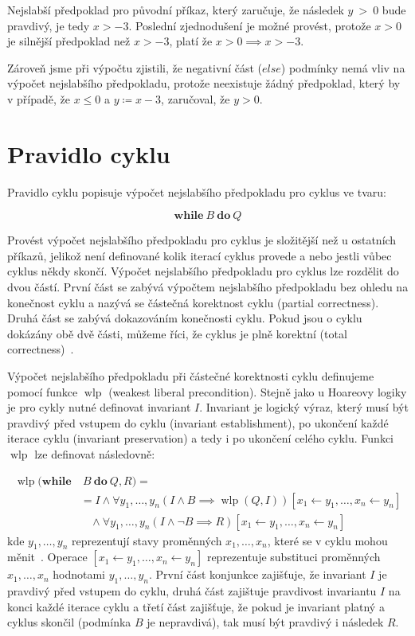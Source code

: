 Nejslabší předpoklad pro původní příkaz,
který zaručuje, že následek $y~>~0$ bude pravdivý, je tedy $x > -3$.
Poslední zjednodušení je možné provést, protože $x > 0$ je silnější předpoklad než $x > -3$,
platí že $x > 0 \implies x > -3$.

Zároveň jsme při výpočtu zjistili, že negativní část ($else$) podmínky nemá vliv na výpočet nejslabšího předpokladu,
protože neexistuje žádný předpoklad, který by v případě, že $x \leq 0$ a $y \coloneqq x - 3$, zaručoval, že $y > 0$.

\section{Pravidlo cyklu}
\label{sec:pravidlo-cyklu}

Pravidlo cyklu popisuje výpočet nejslabšího předpokladu pro cyklus ve tvaru:

\begin{equation*}
    \textbf{while} \ B \ \textbf{do} \ Q
\end{equation*}

Provést výpočet nejslabšího předpokladu pro cyklus je složitější než u ostatních příkazů,
jelikož není definované kolik iterací cyklus provede a nebo jestli vůbec cyklus někdy skončí.
Výpočet nejslabšího předpokladu pro cyklus lze rozdělit do dvou částí.
První část se zabývá výpočtem nejslabšího předpokladu bez ohledu na konečnost cyklu
a nazývá se částečná korektnost cyklu (partial correctness).
Druhá část se zabývá dokazováním konečnosti cyklu.
Pokud jsou o cyklu dokázány obě dvě části,
můžeme říci, že cyklus je plně korektní (total correctness)~\cite{arusoaie2024wp}.

Výpočet nejslabšího předpokladu při částečné korektnosti cyklu
definujeme pomocí funkce $\operatorname{wlp}$ (weakest liberal precondition).
Stejně jako u Hoareovy logiky je pro cykly nutné definovat invariant $I$.
Invariant je logický výraz, který musí být pravdivý před vstupem do cyklu (invariant establishment),
po ukončení každé iterace cyklu (invariant preservation) a tedy i po ukončení celého cyklu.
Funkci $\operatorname{wlp}$ lze definovat následovně:

\begin{align*}
    \operatorname{wlp}(\textbf{while} & \ B \ \textbf{do} \ Q, R) = \\
        & = I \land \forall y_1,\ldots,y_n \left( I \land B \implies \operatorname{wlp}(Q, I) \right)[x_1 \leftarrow y_1, \ldots, x_n \leftarrow y_n] \\
        & \ \ \ \  \land \forall y_1,\ldots,y_n \left( I \land \neg B \implies R \right)[x_1 \leftarrow y_1, \ldots, x_n \leftarrow y_n]
\end{align*}
kde $y_1, \ldots, y_n$ reprezentují stavy proměnných $x_1, \ldots, x_n$, které se v cyklu mohou měnit~\cite{arusoaie2024wp}.
Operace $[x_1 \leftarrow y_1, \ldots, x_n \leftarrow y_n]$ reprezentuje substituci proměnných $x_1, \ldots, x_n$ hodnotami $y_1, \ldots, y_n$.
První část konjunkce zajišťuje, že invariant $I$ je pravdivý před vstupem do cyklu,
druhá část zajištuje pravdivost invariantu $I$ na konci každé iterace cyklu
a třetí část zajišťuje, že pokud je invariant platný a cyklus skončil (podmínka $B$ je nepravdivá),
tak musí být pravdivý i následek $R$.

